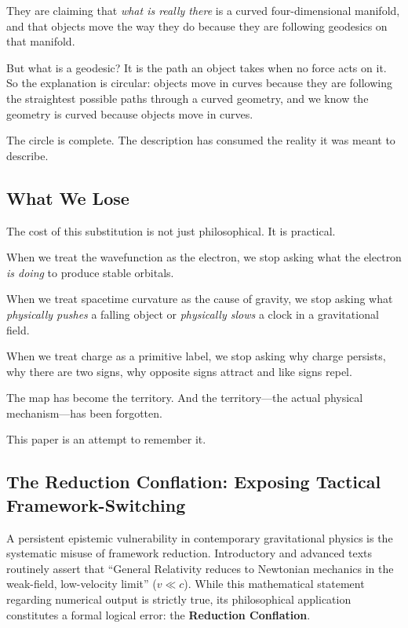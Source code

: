 \documentclass[12pt, a4paper]{article}
\begin{document}
They are claiming that \textit{what is really there} is a curved four-dimensional manifold, and that objects move the way they do because they are following geodesics on that manifold.

But what is a geodesic? It is the path an object takes when no force acts on it. So the explanation is circular: objects move in curves because they are following the straightest possible paths through a curved geometry, and we know the geometry is curved because objects move in curves.

The circle is complete. The description has consumed the reality it was meant to describe.

\subsection{What We Lose}

The cost of this substitution is not just philosophical. It is practical.

When we treat the wavefunction as the electron, we stop asking what the electron \textit{is doing} to produce stable orbitals.

When we treat spacetime curvature as the cause of gravity, we stop asking what \textit{physically pushes} a falling object or \textit{physically slows} a clock in a gravitational field.

When we treat charge as a primitive label, we stop asking why charge persists, why there are two signs, why opposite signs attract and like signs repel.

The map has become the territory. And the territory—the actual physical mechanism—has been forgotten.

This paper is an attempt to remember it.

\subsection{The Reduction Conflation: Exposing Tactical Framework-Switching}
\label{sec:reduction_conflation}

A persistent epistemic vulnerability in contemporary gravitational physics is the systematic misuse of framework reduction. Introductory and advanced texts routinely assert that ``General Relativity reduces to Newtonian mechanics in the weak-field, low-velocity limit'' ($v \ll c$). While this mathematical statement regarding numerical output is strictly true, its philosophical application constitutes a formal logical error: the \textbf{Reduction Conflation}.
\end{document}
